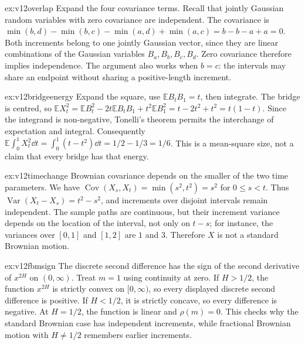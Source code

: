 \begin{solution}{ex:v12overlap}
\idea Expand the four covariance terms. Recall that jointly Gaussian random variables with zero covariance are independent.
\writeup The covariance is $\min(b,d)-\min(b,c)-\min(a,d)+\min(a,c)=b-b-a+a=0$. Both increments belong to one jointly Gaussian vector, since they are linear combinations of the Gaussian variables $B_a,B_b,B_c,B_d$. Zero covariance therefore implies independence. The argument also works when $b=c$: the intervals may share an endpoint without sharing a positive-length increment.
\end{solution}

\begin{solution}{ex:v12bridgeenergy}
\idea Expand the square, use $\mathbb EB_tB_1=t$, then integrate.
\writeup The bridge is centred, so $\mathbb EX_t^2=\mathbb EB_t^2-2t\mathbb EB_tB_1+t^2\mathbb EB_1^2=t-2t^2+t^2=t(1-t)$. Since the integrand is non-negative, Tonelli's theorem permits the interchange of expectation and integral. Consequently $\mathbb E\int_0^1X_t^2\dd t=\int_0^1(t-t^2)\dd t=1/2-1/3=1/6$. This is a mean-square size, not a claim that every bridge has that energy.
\end{solution}

\begin{solution}{ex:v12timechange}
\idea Brownian covariance depends on the smaller of the two time parameters.
\writeup We have $\operatorname{Cov}(X_s,X_t)=\min(s^2,t^2)=s^2$ for $0\le s<t$. Thus $\operatorname{Var}(X_t-X_s)=t^2-s^2$, and increments over disjoint intervals remain independent. The sample paths are continuous, but their increment variance depends on the location of the interval, not only on $t-s$; for instance, the variances over $[0,1]$ and $[1,2]$ are $1$ and $3$. Therefore $X$ is not a standard Brownian motion.
\end{solution}

\begin{solution}{ex:v12fbmsign}
\idea The discrete second difference has the sign of the second derivative of $x^{2H}$ on $(0,\infty)$. Treat $m=1$ using continuity at zero.
\writeup If $H>1/2$, the function $x^{2H}$ is strictly convex on $[0,\infty)$, so every displayed discrete second difference is positive. If $H<1/2$, it is strictly concave, so every difference is negative. At $H=1/2$, the function is linear and $\rho(m)=0$. This checks why the standard Brownian case has independent increments, while fractional Brownian motion with $H\ne1/2$ remembers earlier increments.
\end{solution}


